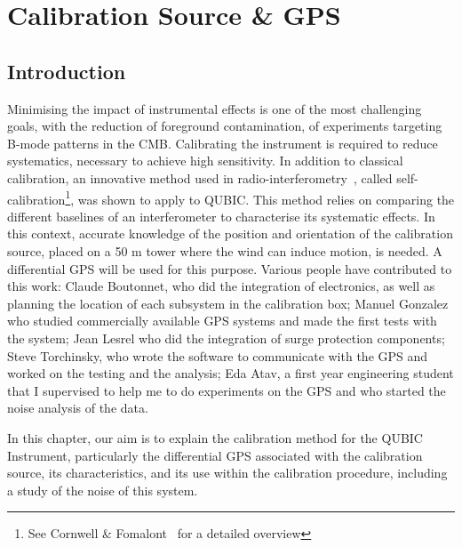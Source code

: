 \documentclass[../../thesis.tex]{subfiles}
\begin{document}
\chapter{Calibration Source \& GPS} \label{chap:gps}
\ifSubfilesClassLoaded{
    \tableofcontents
}{
    \minitoc
}

\section{Introduction}

Minimising the impact of instrumental effects is one of the most challenging goals, with the reduction of foreground contamination, of experiments targeting B-mode patterns in the CMB. Calibrating the instrument is required to reduce systematics, necessary to achieve high sensitivity. In addition to classical calibration, an innovative method used in radio-interferometry~\cite{paper_selfcal_1,paper_selfcal_2}, called self-calibration\footnote{See Cornwell \& Fomalont~\cite{selfcal_overview} for a detailed overview}, was shown to apply to QUBIC. This method relies on comparing the different baselines of an interferometer to characterise its systematic effects. In this context, accurate knowledge of the position and orientation of the calibration source, placed on a 50 m tower where the wind can induce motion, is needed. A differential GPS will be used for this purpose. Various people have contributed to this work: Claude Boutonnet, who did the integration of electronics, as well as planning the location of each subsystem in the calibration box; Manuel Gonzalez who studied commercially available GPS systems and made the first tests with the system; Jean Lesrel who did the integration of surge protection components; Steve Torchinsky, who wrote the software to communicate with the GPS and worked on the testing and the analysis; Eda Atav, a first year engineering student that I supervised to help me to do experiments on the GPS and who started the noise analysis of the data.

In this chapter, our aim is to explain the calibration method for the QUBIC Instrument, particularly the differential GPS associated with the calibration source, its characteristics, and its use within the calibration procedure, including a study of the noise of this system. \\

\end{document}
